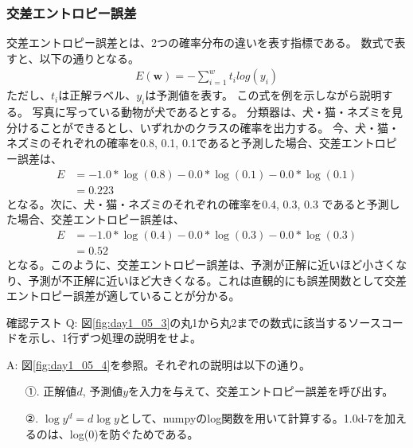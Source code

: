 \documentclass{ltjsarticle}
\begin{document}
\subsubsection{交差エントロピー誤差}
交差エントロピー誤差とは、2つの確率分布の違いを表す指標である。
数式で表すと、以下の通りとなる。
\begin{align}
  E(\mathbf{w}) = -\sum_{i=1}^{w} t_i log(y_i)
\end{align}
ただし、$t_i$は正解ラベル、$y_i$は予測値を表す。
この式を例を示しながら説明する。
写真に写っている動物が犬であるとする。
分類器は、犬・猫・ネズミを見分けることができるとし、いずれかのクラスの確率を出力する。
今、犬・猫・ネズミのそれぞれの確率を0.8, 0.1, 0.1であると予測した場合、交差エントロピー誤差は、
\begin{align}
  E &= -1.0*\log(0.8) - 0.0*\log(0.1) - 0.0*\log(0.1) \\
   &= 0.223
\end{align}
となる。次に、犬・猫・ネズミのそれぞれの確率を0.4, 0.3, 0.3 であると予測した場合、交差エントロピー誤差は、
\begin{align}
  E &= -1.0*\log(0.4) - 0.0*\log(0.3) - 0.0*\log(0.3) \\
   &= 0.52
\end{align}
となる。このように、交差エントロピー誤差は、予測が正解に近いほど小さくなり、予測が不正解に近いほど大きくなる。これは直観的にも誤差関数として交差エントロピー誤差が適していることが分かる。

\begin{itembox}[l]{確認テスト}
  Q: 図\ref{fig:day1_05_3}の丸1から丸2までの数式に該当するソースコードを示し、1行ずつ処理の説明をせよ。

  A: 図\ref{fig:day1_05_4}を参照。それぞれの説明は以下の通り。
  \begin{itemize}
    \item[①.] 正解値$d$, 予測値$y$を入力を与えて、交差エントロピー誤差を呼び出す。 
    \item[②.] $\log{y^d} = d\log{y}$として、numpyのlog関数を用いて計算する。1.0d-7を加えるのは、log(0)を防ぐためである。
  \end{itemize}
  
\end{itembox}
\end{document}
